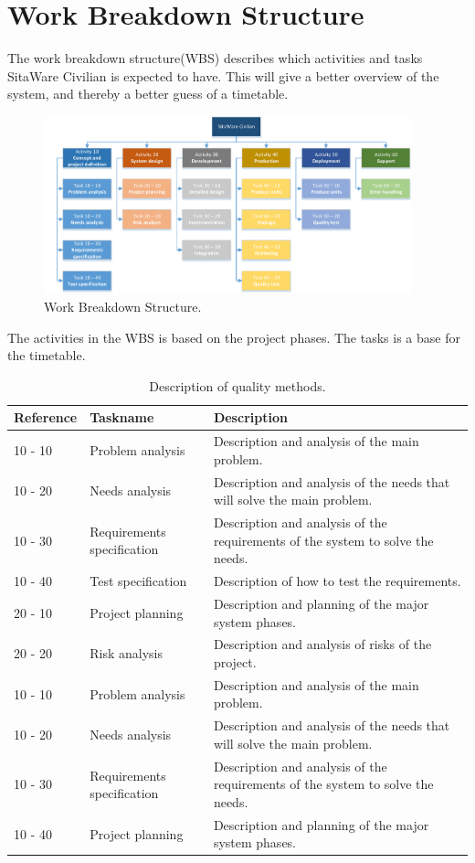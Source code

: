 \chapter{Work Breakdown Structure}

The work breakdown structure(WBS) describes which activities and tasks SitaWare Civilian is expected to have. This will give a better overview of the system, and thereby a better guess of a timetable.

\begin{figure}[H]
\centering
\includegraphics[width=0.95\textwidth]
{Billeder/WBS/WBS_v1.0.pdf}
\caption{Work Breakdown Structure.}
\label{fig:WBS}
\end{figure}

The activities in the WBS is based on the project phases. The tasks is a base for the timetable.

\begin{table}[H]
\begin{tabular}{|l|l|p{9cm}|}
\hline
\textbf{Reference} & \textbf{Taskname} & \textbf{Description} \\ \hline
10 - 10 & Problem analysis & Description and analysis of the main problem. 
\\  \hline
10 - 20 & Needs analysis & Description and analysis of the needs that will solve the main problem. 
\\  \hline
10 - 30 & Requirements specification & Description and analysis of the requirements of the system to solve the needs. 
\\  \hline 
10 - 40 & Test specification & Description of how to test the requirements.
\\  \hline
20 - 10 & Project planning & Description and planning of the major system phases.
\\  \hline 
20 - 20 & Risk analysis & Description and analysis of risks of the project.
\\ \hline
10 - 10 & Problem analysis & Description and analysis of the main problem. 
\\  \hline
10 - 20 & Needs analysis & Description and analysis of the needs that will solve the main problem. 
\\  \hline
10 - 30 & Requirements specification & Description and analysis of the requirements of the system to solve the needs. 
\\  \hline 
10 - 40 & Project planning & Description and planning of the major system phases.
\\  \hline 
\end{tabular}
\caption{Description of quality methods.}
\end{table}